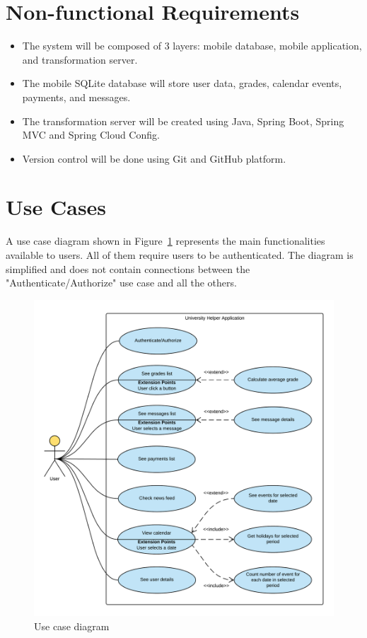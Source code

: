 \section{Non-functional Requirements}
\begin{itemize}
    \item The system will be composed of 3 layers: mobile database, mobile application, and transformation server.
    \item The mobile SQLite database will store user data, grades, calendar events, payments, and messages.
    \item The transformation server will be created using Java, Spring Boot, Spring MVC and Spring Cloud Config.
    \item Version control will be done using Git and GitHub platform.
\end{itemize}

\section{Use Cases}
A use case diagram shown in Figure~\ref{fig:use-case-diagram} represents the main functionalities available to users. All of them require users to be authenticated. The diagram is simplified and does not contain connections between the "Authenticate/Authorize" use case and all the others.

\begin{figure}[htb]
    \centering
    \includegraphics[width=\textwidth]{fig02/use_case_diagram.png}
    \caption{Use case diagram} \label{fig:use-case-diagram}
\end{figure}

